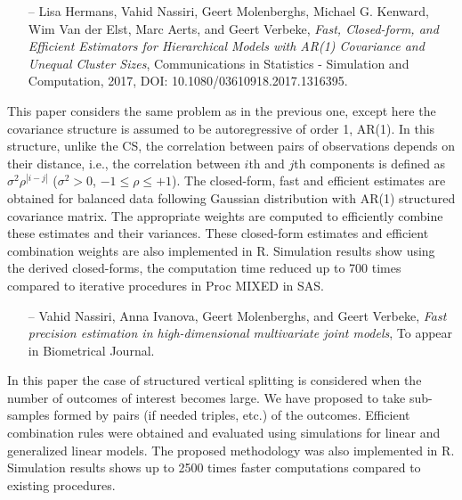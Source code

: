 \documentclass[14pt]{article}
\begin{document}
\begin{itemize}
\item[--]{\textsf{Lisa Hermans, Vahid Nassiri, Geert Molenberghs, Michael G. Kenward, Wim Van der Elst, Marc Aerts, and Geert Verbeke}}, {\it Fast, Closed-form, and Efficient Estimators for Hierarchical Models with AR(1) Covariance and Unequal Cluster Sizes}, Communications in Statistics - Simulation and Computation, 2017, DOI: 10.1080/03610918.2017.1316395.
\end{itemize}
This paper considers the same problem as in the previous one, except here the covariance structure is assumed to be autoregressive of order 1, AR(1). In this structure, unlike the CS, the correlation between pairs of observations depends on their distance, i.e., the correlation between $i$th and $j$th components is defined as $\sigma^2 \rho^{|i-j|}$ ($\sigma^2>0$, $-1\leq\rho\leq +1$). The closed-form, fast and efficient estimates are obtained for balanced data following Gaussian distribution with AR(1) structured covariance matrix. The appropriate weights are computed to efficiently combine these estimates and their variances. These closed-form estimates and efficient combination weights are also implemented in \textsf{R}. Simulation results show using the derived closed-forms, the computation time reduced up to 700 times compared to iterative procedures in \textsf{Proc MIXED} in \textsf{SAS}.



\begin{itemize}
\item[--]{\textsf{Vahid Nassiri, Anna Ivanova, Geert Molenberghs, and Geert Verbeke}}, {\it Fast precision estimation in high-dimensional multivariate joint models}, To appear in Biometrical Journal.
\end{itemize}
In this paper the case of structured vertical splitting is considered when the number of outcomes of interest becomes large. We have proposed to take sub-samples formed by pairs (if needed triples, etc.) of the outcomes. Efficient combination rules were obtained and evaluated using simulations for linear and generalized linear models. The proposed methodology was also implemented in \textsf{R}. Simulation results shows up to 2500 times faster computations compared to existing procedures.
\end{document}
